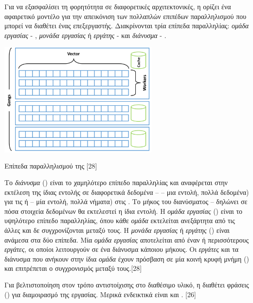 Για να εξασφαλίσει τη φορητότητα σε διαφορετικές αρχιτεκτονικές, η  ορίζει ένα αφαιρετικό μοντέλο για την απεικόνιση των πολλαπλών επιπέδων παραλληλισμού που μπορεί να διαθέτει ένας επεξεργαστής. Διακρίνονται τρία επίπεδα παραλληλίας: \textit{ομάδα εργασίας} - , \textit{μονάδα εργασίας} ή \textit{εργάτης} -  και \textit{διάνυσμα} - . 
 
\begin{Illustration}[!h] 
	\centering
	\includegraphics[width=0.6\textwidth]{images/image059.png} 
	\caption{Επίπεδα παραλληλισμού της  [28]}
	\label{image-3.16}
\end{Illustration}


Το \textit{διάνυσμα} () είναι το χαμηλότερο επίπεδο παραλληλίας και αναφέρεται στην εκτέλεση της ίδιας εντολής σε διαφορετικά δεδομένα –  – μια εντολή, πολλά δεδομένα) για τις  ή  – μία εντολή, πολλά νήματα) στις . Το μήκος του διανύσματος –  δηλώνει σε πόσα στοιχεία δεδομένων θα εκτελεστεί η ίδια εντολή. Η \textit{ομάδα εργασίας} () είναι το υψηλότερο επίπεδο παραλληλίας, όπου κάθε \textit{ομάδα} εκτελείται ανεξάρτητα από τις άλλες και δε συγχρονίζονται μεταξύ τους. Η \textit{μονάδα εργασίας }ή\textit{ εργάτης} () είναι ανάμεσα στα δύο επίπεδα. Μία \textit{ομάδα εργασίας} αποτελείται από έναν ή περισσότερους \textit{εργάτες}, οι οποίοι λειτουργούν σε ένα διάνυσμα κάποιου μήκους. Οι \textit{εργάτες} και τα διάνυσμα που ανήκουν στην ίδια \textit{ομάδα} έχουν πρόσβαση σε μία κοινή κρυφή μνήμη () και επιτρέπεται ο συγχρονισμός μεταξύ τους.[28]

Για βελτιστοποίηση στον τρόπο αντιστοίχισης στο διαθέσιμο υλικό, η  διαθέτει φράσεις () για διαμοιρασμό της εργασίας. Μερικά ενδεικτικά είναι και . [26]
